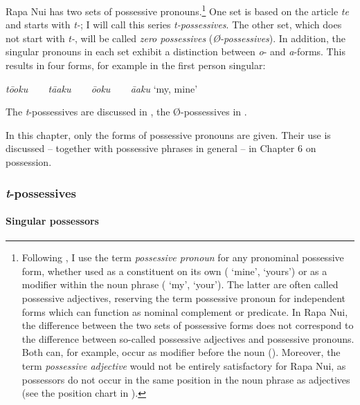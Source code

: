 Rapa Nui has two sets of possessive pronouns.\footnote{\label{fn:162}Following \citet[182]{Dryer2007Noun}, I use the term \textit{possessive pronoun} for any pronominal possessive form, whether used as a constituent on its own ( ‘mine’, ‘yours’) or as a modifier within the noun phrase ( ‘my’, ‘your’). The latter are often called possessive adjectives, reserving the term possessive pronoun for independent forms which can function as nominal complement or predicate. In Rapa Nui, the difference between the two sets of possessive forms does not correspond to the difference between so-called possessive adjectives and possessive pronouns. Both can, for example, occur as modifier before the noun (). Moreover, the term \textit{possessive adjective} would not be entirely satisfactory for Rapa Nui, as possessors do not occur in the same position in the noun phrase as adjectives (see the position chart in ).} One set is based on the article \textit{te} and starts with \textit{t-}; I will call this series \textit{t-possessives}. The other set, which does not start with \textit{t\nobreakdash-}, will be called \textit{zero possessives} (\textit{Ø-possessives}). In addition, the singular pronouns in each set exhibit a distinction between \textit{o}{}- and \textit{a}{}-forms. This results in four forms, for example in the first person singular:

\ea
 \textit{tō{\ꞌ}oku  ~ ~   tā{\ꞌ}aku  ~ ~   ō{\ꞌ}oku   ~ ~ {\ꞌ}ā{\ꞌ}aku   }  ‘my, mine’
\z

The \textit{t}{}-possessives are discussed in , the Ø-possessives in .

In this chapter, only the forms of possessive pronouns are given. Their use is discussed – together with possessive phrases in general – in Chapter 6 on possession.

\subsubsection[T{}-possessives]{\textit{t}{}-possessives}\label{sec:4.2.2.1}
\paragraph{Singular possessors}\label{sec:4.2.2.1.1}

